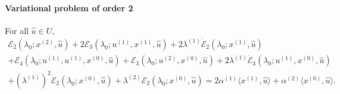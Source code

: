 \documentclass[12pt, final]{scrartcl}
\theoremstyle{definition}
\newcommand{\E}{\mathcal E}
\newcommand{\order}[2][1]{#2^{(#1)}}
\begin{document}
\paragraph{Variational problem of order 2} For all $\hat{u} \in U$,
\begin{multline*}
    \E_2(\lambda_0; \order[2]x, \hat{u})
    + 2\E_3(\lambda_0; \order[1]u, \order[1]x, \hat{u})
    + 2 \order[1]\lambda \dot{\E}_2(\lambda_0; \order[1]x, \hat{u})\\
    + \E_4(\lambda_0; \order[1]u, \order[1]u, \order[0]x, \hat{u})
    + \E_3(\lambda_0; \order[2]u, \order[0]x, \hat{u})
    + 2\order[1]\lambda \dot{\E}_3(\lambda_0; \order[1]u, \order[0]x, \hat{u})\\
    + ( \order[1]\lambda )^2 \ddot{\E}_2(\lambda_0; \order[0]x, \hat{u})
    + \order[2]\lambda \dot{\E}_2(\lambda_0; \order[0]x, \hat{u})
    = 2 \order[1]\alpha \langle \order[1]x, \hat{u} \rangle
    + \order[2]\alpha \langle \order[0]x, \hat{u} \rangle.
\end{multline*}
\end{document}
